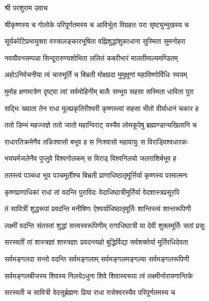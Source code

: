 
श्री परशुराम उवाच

\twolineshloka
{श्रीकृष्णस्य च गोलोके परिपूर्णतमस्य च}
{आविर्भूता विग्रहतः परा सृष्ट्युन्मुखस्य च}

\twolineshloka
{सूर्यकोटिप्रभायुक्ता वस्त्रालङ्कारभूषिता}
{वह्निशुद्धांशुकाधाना सुस्मिता सुमनोहरा}

\twolineshloka
{नवयौवनसम्पन्ना सिन्दूरारुण्यशोभिता}
{ललितं कबरीभारं मालतीमाल्यमण्डितम्}

\twolineshloka
{अहोऽनिर्वचनीया त्वं चारुमूर्तिं च बिभ्रती}
{मोक्षप्रदा मुमुक्षूणां महाविष्णोर्विधिः स्वयम्}

\twolineshloka
{मुमोह क्षणमात्रेण दृष्ट्वा त्वां सर्वमोहिनीम्}
{बालैः सम्भूय सहसा सस्मिता धाविता पुरा}

\twolineshloka
{सद्भिः ख्याता तेन राधा मूलप्रकृतिरीश्वरी}
{कृष्णस्त्वां सहसा भीतो वीर्याधानं चकार ह}

\twolineshloka
{ततो डिम्भं महज्जज्ञे ततो जातो महान्विराट्}
{यस्यैव लोमकूपेषु ब्रह्माण्डान्यखिलानि च}

\twolineshloka
{राधारतिक्रमेणैव तन्निःश्वासो बभूव ह}
{स निःश्वासो महावायुः स विराड्\mbox{}विश्वधारकः}

\twolineshloka
{भयघर्मजलेनैव पुप्लुवे विश्वगोलकम्}
{स विराड् विश्वनिलयो जलराशिर्बभूव ह}

\twolineshloka
{ततस्त्वं पञ्चधा भूय पञ्चमूर्तीश्च बिभ्रती}
{प्राणाधिष्ठातृमूर्त्तिर्या कृष्णस्य परमात्मनः}

\twolineshloka
{कृष्णप्राणाधिकां राधां तां वदन्ति पुराविदः}
{वेदाधिष्ठात्रीमूर्तिर्या वेदशास्त्रप्रसूरपि}

\twolineshloka
{तं सावित्रीं शुद्धरूपां प्रवदन्ति मनीषिणः}
{ऐश्वर्याधिष्ठातृमूर्तिः शान्तिस्त्वं शान्तरूपिणी}

\twolineshloka
{लक्ष्मीं वदन्ति संतस्तां शुद्धां सत्त्‍‌वस्वरूपिणीम्}
{रागाधिष्ठात्री या देवी शुक्लमूर्तिः सतां प्रसूः}

\twolineshloka
{सरस्वतीं तां शास्त्रज्ञां शास्त्रज्ञाः प्रवदन्त्यहो}
{बुद्धिर्विद्या सर्वशक्तेर्या मूर्तिरधिदेवता}

\twolineshloka
{सर्वमङ्गलदा सन्तो वदन्ति सर्वमङ्गलाम्}
{सर्वमङ्गलमङ्गल्या सर्वमङ्गलरूपिणी}

\twolineshloka
{सर्वमङ्गलबीजस्य शिवस्य निलयेऽधुना}
{शिवे शिवास्वरूपा त्वं लक्ष्मीर्नारायणान्तिके}

\twolineshloka
{सरस्वती च सावित्री वेदसू‌र्ब्रह्मणः प्रिया}
{राधा रासेश्वरस्यैव परिपूर्णतमस्य च}


